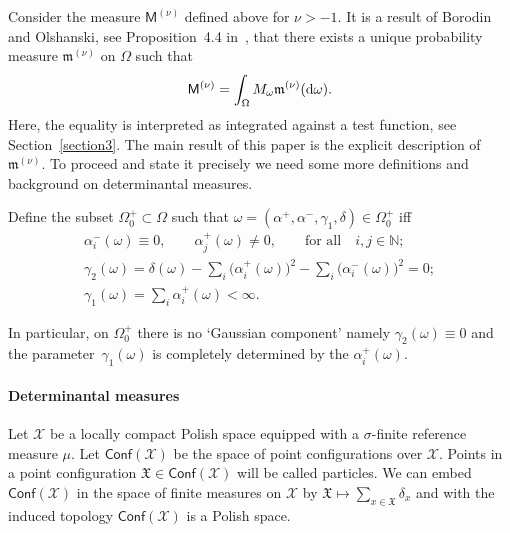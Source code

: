 \documentclass[pdftex]{sigma}
\numberwithin{equation}{section}
\begin{document}
Consider the measure $\mathsf{M}^{(\nu)}$ defined above for $\nu >-1$. It is a result of Borodin and Olshanski, see Proposition~4.4 in~\cite{BorodinOlshanskiErgodic}, that there exists a unique probability measure $\mathfrak{m}^{(\nu)}$ on $\Omega$ such that
\begin{gather*}
\mathsf{M}^{(\nu)}=\int_{\Omega}^{}M_{\omega}\mathfrak{m}^{(\nu)}({\rm d}\omega).
\end{gather*}
Here, the equality is interpreted as integrated against a test function, see Section~\ref{section3}.
The main result of this paper is the explicit description of~$\mathfrak{m}^{(\nu)}$. To proceed and state it precisely we need some more definitions and background on determinantal measures.

\begin{Definition} Define the subset $\Omega_0^+ \subset \Omega$ such that $\omega=\left(\alpha^+,\alpha^-, \gamma_1, \delta\right) \in \Omega_0^+$ iff
\begin{gather*}
\alpha_i^{-}(\omega) \equiv 0, \qquad \alpha_j^{+}(\omega) \neq 0, \qquad \text{for all} \quad i,j \in \mathbb{N};\\
\gamma_2(\omega) =\delta(\omega)-\sum_{i}^{}\big(\alpha_i^+(\omega)\big)^2-\sum_{i}^{}\big(\alpha_i^-(\omega)\big)^2=0;\\
\gamma_1(\omega) = \sum_{i }^{}\alpha_i^{+}(\omega)<\infty.
\end{gather*}
\end{Definition}
In particular, on $\Omega_0^+$ there is no `Gaussian component' namely $\gamma_2(\omega)\equiv 0$ and the para\-me\-ter~$\gamma_1(\omega)$ is completely determined by the $\alpha_i^+(\omega)$.

\paragraph{Determinantal measures}
Let $\mathcal{X}$ be a locally compact Polish space equipped with a $\sigma$-finite reference measure $\mu$. Let $\mathsf{Conf}(\mathcal{X})$ be the space of point configurations over $\mathcal{X}$. Points in a point configuration $\mathfrak{X} \in \mathsf{Conf}(\mathcal{X})$ will be called particles. We can embed $\mathsf{Conf}(\mathcal{X})$ in the space of finite measures on $\mathcal{X}$ by $\mathfrak{X}\mapsto \sum\limits_{x \in \mathfrak{X}}^{}\delta_x$ and with the induced topology $\mathsf{Conf}(\mathcal{X})$ is a Polish space.
\end{document}
